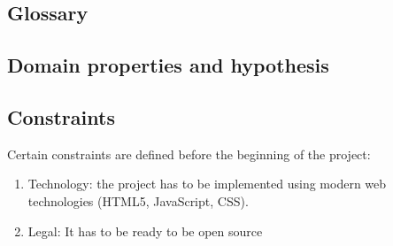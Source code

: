 \subsection{Glossary}

\subsection{Domain properties and hypothesis}
\subsection{Constraints}
Certain constraints are defined before the beginning of the project:
\begin{enumerate}
    \item Technology: the project has to be implemented using modern web technologies (HTML5, JavaScript, CSS).
    \item Legal: It has to be ready to be open source
\end{enumerate}



